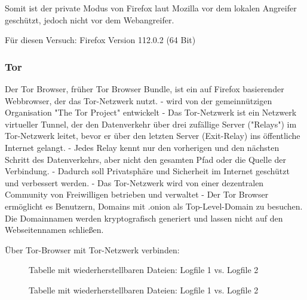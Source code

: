 Somit ist der private Modus von Firefox laut Mozilla vor dem lokalen Angreifer geschützt, jedoch nicht vor dem Webangreifer.

Für diesen Versuch: Firefox Version 112.0.2 (64 Bit)

\subsubsection*{Tor}

Der Tor Browser, früher Tor Browser Bundle, ist ein auf Firefox basierender Webbrowser, der das Tor-Netzwerk nutzt.
- wird von der gemeinnützigen Organisation "The Tor Project" entwickelt
- Das Tor-Netzwerk ist ein Netzwerk virtueller Tunnel, der den Datenverkehr über drei zufällige Server ("Relays") im Tor-Netzwerk leitet, bevor er über den letzten Server (Exit-Relay) ins öffentliche Internet gelangt.
- Jedes Relay kennt nur den vorherigen und den nächsten Schritt des Datenverkehrs, aber nicht den gesamten Pfad oder die Quelle der Verbindung.
- Dadurch soll Privatsphäre und Sicherheit im Internet geschützt und verbessert werden.
- Das Tor-Netzwerk wird von einer dezentralen Community von Freiwilligen betrieben und verwaltet
- Der Tor Browser ermöglicht es Benutzern, Domains mit .onion als Top-Level-Domain zu besuchen. Die Domainnamen werden kryptografisch generiert und lassen nicht auf den Webseitennamen schließen. 

Über Tor-Browser mit Tor-Netzwerk verbinden:
\begin{figure}[h!]
	\centerline{}
	\caption{Tabelle mit wiederherstellbaren Dateien: Logfile 1 vs. Logfile 2}
\end{figure}
\begin{figure}[h!]
	\centerline{}
	\caption{Tabelle mit wiederherstellbaren Dateien: Logfile 1 vs. Logfile 2}
\end{figure}

